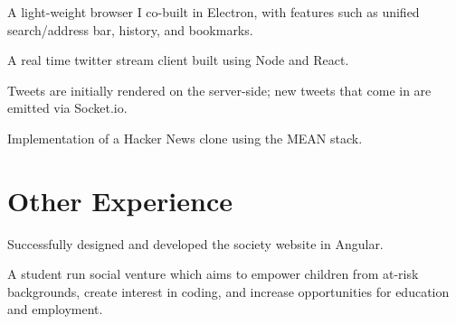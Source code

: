 \documentclass[a4paper]{resume}
\begin{document}
\begin{minipage}[t]{0.66\textwidth}

\begin{tightitemize}
\item A light-weight browser I co-built in Electron, with features such as unified search/address bar, history, and bookmarks.
\end{tightitemize}

\sectionspace %




\begin{tightitemize}
\item A real time twitter stream client built using Node and React.
\item Tweets are initially rendered on the server-side; new tweets that come in are emitted via Socket.io.
\end{tightitemize}

\sectionspace %




\begin{tightitemize}
\item Implementation of a Hacker News clone using the MEAN stack.
\end{tightitemize}

\sectionspace %



\section{Other Experience}

Successfully designed and developed the society website in Angular.

\sectionspace %

A student run social venture which aims to empower children from at-risk backgrounds, create interest in coding, and increase opportunities for education and employment.


\end{minipage}
\end{document}
